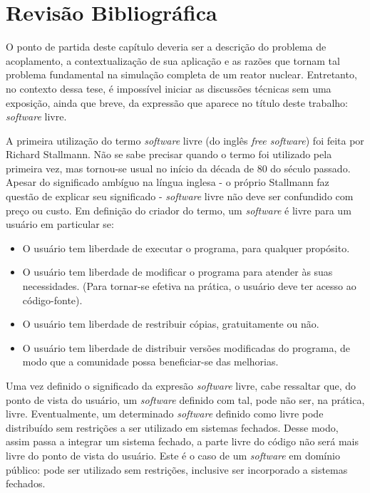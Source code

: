 \chapter{Revisão Bibliográfica}
\label{chap:rev}


O ponto de partida deste capítulo deveria ser a descrição do problema de acoplamento,
a contextualização de sua aplicação e as razões que tornam tal problema fundamental
na simulação completa de um reator nuclear. Entretanto, no contexto dessa tese, é impossível
iniciar as discussões técnicas sem uma exposição, ainda que breve, da expressão que
aparece no título deste trabalho: \textit{software} livre.

A primeira utilização do termo \textit{software} livre (do inglês \textit{free software})
foi feita por Richard Stallmann. Não se sabe precisar quando o termo foi utilizado pela
primeira vez, mas tornou-se usual no início da década de 80 do século passado.
Apesar do significado ambíguo na língua inglesa - o próprio Stallmann faz questão
de explicar seu significado \cite{Stallman2002} - \textit{software} livre não deve
ser confundido com preço ou custo. Em definição do criador do termo, um \textit{software}
é livre para um usuário em particular se:
\begin{itemize}
\item O usuário tem liberdade de executar o programa, para qualquer propósito.
\item O usuário tem liberdade de modificar o programa para atender às suas necessidades.
  (Para tornar-se efetiva na prática, o usuário deve ter acesso ao código-fonte).
\item O usuário tem liberdade de restribuir cópias, gratuitamente ou não.
\item O usuário tem liberdade de distribuir versões modificadas do programa, de modo
  que a comunidade possa beneficiar-se das melhorias.
\end{itemize}

Uma vez definido o significado da expresão \textit{software} livre, cabe ressaltar que, do ponto de
vista do usuário, um \textit{software} definido com tal, pode não ser, na prática, livre.
Eventualmente, um determinado \textit{software} definido como livre pode distribuído sem
restrições a ser utilizado em sistemas
fechados. Desse modo, assim passa a integrar um sistema fechado, a parte livre do código não será mais livre do ponto de vista do usuário. Este é o caso de um \textit{software} em domínio público: pode ser utilizado sem restrições, inclusive ser incorporado a sistemas fechados.

